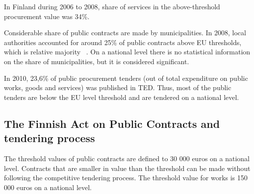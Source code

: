 \documentclass[12pt,a4paper,oneside,pdftex]{report}
\begin{document}
In Finland during 2006 to 2008, share of services in the above-threshold procurement value was 34\%. ~\citep{EU2010}

Considerable share of public contracts are made by municipalities. In 2008, local authorities accounted for around 25\% of public contracts above EU thresholds, which is relative majority ~\citep{EU2010}. On a national level there is no statistical information on the share of municipalities, but it is considered significant.

In 2010, 23,6\% of public procurement tenders (out of total expenditure on public works, goods and services) was published in TED. Thus, most of the public tenders are below the EU level threshold and are tendered on a national level.

\subsection {The Finnish Act on Public Contracts and tendering process}

The threshold values of public contracts are defined to 30 000 euros on a national level. Contracts that are smaller in value than the threshold can be made without following the competitive tendering process. The threshold value for works is 150 000 euros on a national level. ~\citep{Hankintaopas}
\end{document}
